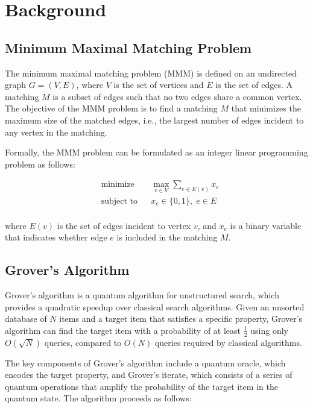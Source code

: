 \section{Background}
\label{sec:background}

\subsection{Minimum Maximal Matching Problem}

The minimum maximal matching problem (MMM) is defined on an undirected graph $G = (V, E)$, where $V$ is the set of vertices and $E$ is the set of edges. A matching $M$ is a subset of edges such that no two edges share a common vertex. The objective of the MMM problem is to find a matching $M$ that minimizes the maximum size of the matched edges, i.e., the largest number of edges incident to any vertex in the matching.

Formally, the MMM problem can be formulated as an integer linear programming problem as follows:

\begin{equation}
\begin{aligned}
& \text{minimize}
& & \max_{v \in V} \sum_{e \in E(v)} x_e \\
& \text{subject to}
& & x_e \in \{0, 1\}, \; e \in E \\
\end{aligned}
\end{equation}

where $E(v)$ is the set of edges incident to vertex $v$, and $x_e$ is a binary variable that indicates whether edge $e$ is included in the matching $M$.

\subsection{Grover's Algorithm}

Grover's algorithm is a quantum algorithm for unstructured search, which provides a quadratic speedup over classical search algorithms. Given an unsorted database of $N$ items and a target item that satisfies a specific property, Grover's algorithm can find the target item with a probability of at least $\frac{1}{2}$ using only $O(\sqrt{N})$ queries, compared to $O(N)$ queries required by classical algorithms.

The key components of Grover's algorithm include a quantum oracle, which encodes the target property, and Grover's iterate, which consists of a series of quantum operations that amplify the probability of the target item in the quantum state. The algorithm proceeds as follows:

